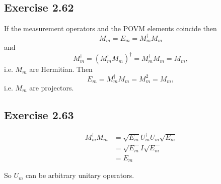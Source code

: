\documentclass{article}
\begin{document}
\subsection*{Exercise 2.62}

If the measurement operators and the POVM elements coincide then \[M_m = E_m = M_m^\dagger M_m\] and \[M_m^\dagger = (M_m^\dagger M_m)^\dagger = M_m^\dagger M_m = M_m,\] i.e. $M_m$ are Hermitian. Then \[E_m = M_m^\dagger M_m = M_m^2 = M_m,\] i.e. $M_m$ are projectors.

\subsection*{Exercise 2.63}

\begin{align*}
  M_m^\dagger M_m & = \sqrt{E_m} U_m^\dagger U_m \sqrt{E_m} \\
                  & = \sqrt{E_m} I \sqrt{E_m}               \\
                  & = E_m
\end{align*}

So $U_m$ can be arbitrary unitary operators.
\end{document}
